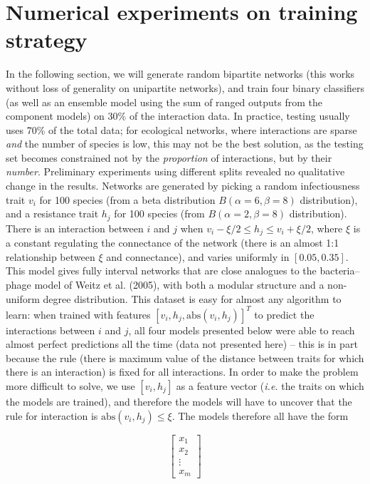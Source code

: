 \documentclass[11pt]{article}
\begin{document}
\hypertarget{numerical-experiments-on-training-strategy}{%
\section{Numerical experiments on training
strategy}\label{numerical-experiments-on-training-strategy}}

In the following section, we will generate random bipartite networks
(this works without loss of generality on unipartite networks), and
train four binary classifiers (as well as an ensemble model using the
sum of ranged outputs from the component models) on 30\% of the
interaction data. In practice, testing usually uses 70\% of the total
data; for ecological networks, where interactions are sparse \emph{and}
the number of species is low, this may not be the best solution, as the
testing set becomes constrained not by the \emph{proportion} of
interactions, but by their \emph{number}. Preliminary experiments using
different splits revealed no qualitative change in the results. Networks
are generated by picking a random infectiousness trait \(v_i\) for 100
species (from a beta distribution \(B(\alpha=6,\beta=8)\) distribution),
and a resistance trait \(h_j\) for 100 species (from
\(B(\alpha=2,\beta=8)\) distribution). There is an interaction between
\(i\) and \(j\) when \(v_i-\xi/2 \le h_j \le v_i+\xi/2\), where \(\xi\)
is a constant regulating the connectance of the network (there is an
almost 1:1 relationship between \(\xi\) and connectance), and varies
uniformly in \([0.05, 0.35]\). This model gives fully interval networks
that are close analogues to the bacteria--phage model of Weitz et al.
(2005), with both a modular structure and a non-uniform degree
distribution. This dataset is easy for almost any algorithm to learn:
when trained with features \([v_i, h_j, \text{abs}(v_i, h_j)] ^T\) to
predict the interactions between \(i\) and \(j\), all four models
presented below were able to reach almost perfect predictions all the
time (data not presented here) -- this is in part because the rule
(there is maximum value of the distance between traits for which there
is an interaction) is fixed for all interactions. In order to make the
problem more difficult to solve, we use \([v_i, h_j]\) as a feature
vector (\emph{i.e.} the traits on which the models are trained), and
therefore the models will have to uncover that the rule for interaction
is \(\text{abs}(v_i, h_j) \le \xi\). The models therefore all have the
form

\[
\begin{bmatrix}
           x_{1} \\
           x_{2} \\
           \vdots \\
           x_{m}
         \end{bmatrix}
\]
\end{document}
